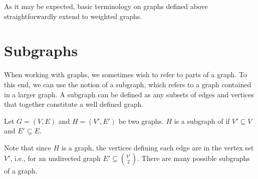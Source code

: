 \begin{cluster}
\label{grp:rmrk:bg::graphs::expected}

\begin{remark}
\label{rmrk:bg::graphs::expected}
As it may be expected, basic terminology on graphs defined above
straightforwardly extend to weighted graphs.

\end{remark}
\end{cluster}


\section{Subgraphs}
\label{sec:bg::graphs::subgraphs}

\begin{cluster}
\label{grp:grm:bg::graphs::working}

\begin{gram}
\label{grm:bg::graphs::working}
When working with graphs, we sometimes wish to refer to parts of a
graph.  To this end, we can use the notion of a subgraph, which refers
to a graph contained in a larger graph. A subgraph can be defined as
any subsets of edges and vertices that together constitute a well
defined graph.

\end{gram}
\end{cluster}

\begin{cluster}
\label{grp:def:bg::graphs::subgraph}

\begin{definition}[Subgraph]
\label{def:bg::graphs::subgraph}
Let $G = (V,E)$ and $H = (V', E')$ be two graphs.  $H$ is a
subgraph of if $V' \subseteq V$ and $E' \subseteq E$.

\end{definition}
\end{cluster}

\begin{cluster}
\label{grp:nt:bg::graphs::graph}

\begin{note}
\label{nt:bg::graphs::graph}
Note that since $H$ is a graph, the vertices defining each edge are in
the vertex set $V'$, i.e., for an undirected graph $E' \subseteq
\binom{V'}{2}$.  There are many possible subgraphs of a graph.

\end{note}
\end{cluster}

